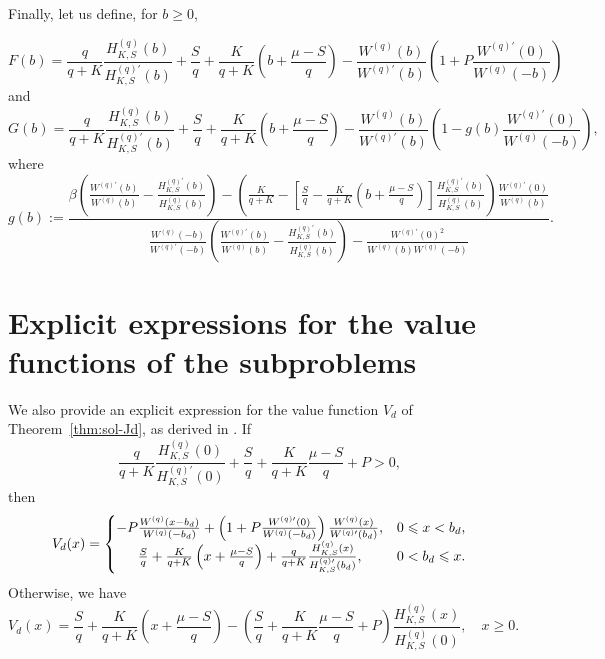 \documentclass[11pt,reqno]{amsart}
\newcommand{\Wq}{W^{(q)}}
\newcommand{\Wqprime}{W^{(q) \prime}}
\newcommand{\Hq}{H^{(q)}_{K,S}}
\newcommand{\Hqprime}{H^{(q) \prime}_{K,S}}
\newcommand{\ettap}[1]{\frac{S}{q} + \frac{K}{q+K}\left(#1 + \frac{\mu - S}{q}\right)}
\newcommand{\ettam}[1]{\frac{S}{q} - \frac{K}{q+K}\left(#1 + \frac{\mu - S}{q}\right)}
\newcommand{\ettaz}{\frac{S}{q} + \frac{K}{q+K}\frac{\mu - S}{q}}
\renewcommand{\geq}{\geqslant}
\renewcommand{\leq}{\leqslant}
\begin{document}
Finally, let us define, for $b \geq 0$,

\begin{equation}\label{def-F}
    F(b) = \frac{q}{q+K} \frac{\Hq(b)}{\Hqprime(b)} + \ettap{b} - \frac{\Wq(b)}{\Wqprime(b)} \left(1 + P \frac{\Wqprime(0)}{\Wq(-b)} \right)
\end{equation}
and
\begin{equation}\label{def-G}
    G(b) = \frac{q}{q+K}\frac{\Hq(b)}{\Hqprime(b)} + \ettap{b} - \frac{\Wq(b)}{\Wqprime (b)}\left(1 - g(b)\frac{\Wqprime (0)}{\Wq(-b)}\right),
\end{equation}
where
\begin{equation}
    g(b) := \frac{\beta\left(\frac{\Wqprime(b)}{\Wq(b)}-\frac{\Hqprime(b)}{\Hq(b)}\right) - \left(\frac{K}{q+K}-\left[\ettam{b}\right]\frac{\Hqprime(b)}{\Hq(b)}\right)\frac{\Wqprime(0)}{\Wq(b)}}{\frac{\Wq(-b)}{\Wqprime(-b)}\left(\frac{\Wqprime(b)}{\Wq(b)}-\frac{\Hqprime(b)}{\Hq(b)}\right) - \frac{\Wqprime(0)^2}{\Wq(b)\Wq(-b)}}.
\end{equation}



\section{Explicit expressions for the value functions of the subproblems}\label{app:Vd}

We also provide an explicit expression for the value function $V_d$ of Theorem~\ref{thm:sol-Jd}, as derived in \cite{renaud-simard_2021, rao_2023, fendri_2025}. If
    \begin{equation}
        \frac{q}{q+K}\frac{\Hq(0)}{\Hqprime(0)} + \ettaz + P > 0,
    \end{equation}
then
   \begin{equation}\label{Vd-expli}
        V_d(x) =
        \begin{cases}
            -P\frac{\Wq(x-b_d)}{\Wq(-b_d)} + \left(1 + P\frac{\Wqprime (0)}{\Wq(-b_d)}\right)\frac{\Wq(x)}{\Wqprime (b_d)}, &0\leq x< b_d, \\
            \hfil \ettap{x} + \frac{q}{q+K}\frac{\Hq(x)}{\Hqprime (b_d)}, &0 < b_d \leq x.
        \end{cases}
    \end{equation}
Otherwise, we have
    \begin{equation}\label{Vd-bd0-expli}
        V_d(x) = \ettap{x} - \left(\ettaz + P\right)\frac{\Hq(x)}{\Hq(0)}, \quad x\geq 0.
    \end{equation} 
\end{document}
